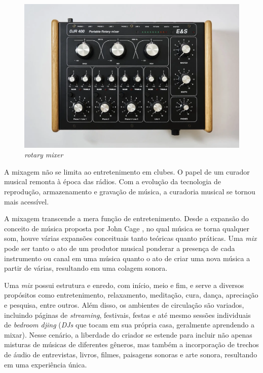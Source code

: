 \begin{figure}[h]
	\centering
    \includegraphics[scale=0.2]{figuras/fig18.png}
	\caption{\textit{rotary mixer} \cite{electroniquespectacleampAUDIO}}
	\label{fig18}
\end{figure}

A mixagem não se limita ao entretenimento em clubes. O papel de um curador musical remonta à época das rádios. Com a evolução da tecnologia de reprodução, armazenamento e gravação de música, a curadoria musical se tornou mais acessível.

A mixagem transcende a mera função de entretenimento. Desde a expansão do conceito de música proposta por John Cage \cite{cage}, no qual música se torna qualquer som, houve várias expansões conceituais tanto teóricas quanto práticas. Uma \textit{mix} pode ser tanto o ato de um produtor musical ponderar a presença de cada instrumento ou canal em uma música quanto o ato de criar uma nova música a partir de várias, resultando em uma colagem sonora.

Uma \textit{mix} possui estrutura e enredo, com início, meio e fim, e serve a diversos propósitos como entretenimento, relaxamento, meditação, cura, dança, apreciação e pesquisa, entre outros. Além disso, os ambientes de circulação são variados, incluindo páginas de \textit{streaming}, festivais, festas e até mesmo sessões individuais de \textit{bedroom djing} (\textit{DJs} que tocam em sua própria casa, geralmente aprendendo a mixar). Nesse cenário, a liberdade do criador se estende para incluir não apenas misturas de músicas de diferentes gêneros, mas também a incorporação de trechos de áudio de entrevistas, livros, filmes, paisagens sonoras e arte sonora, resultando em uma experiência única.

